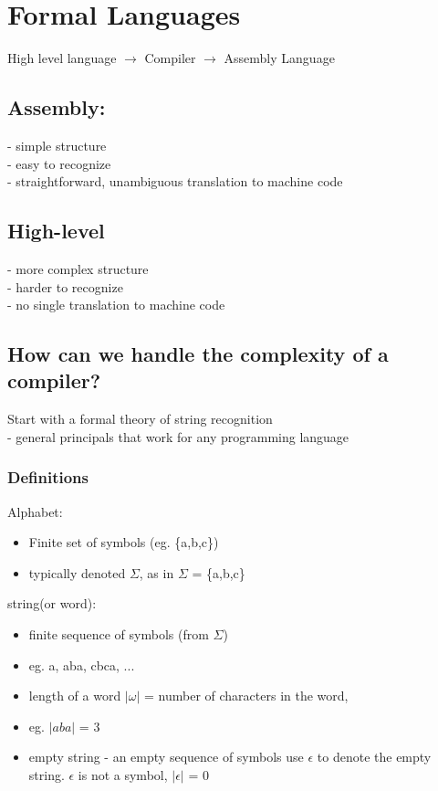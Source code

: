 \documentclass[12pt]{article}
\begin{document}
	\section*{Formal Languages}
	
	High level language $\rightarrow$ Compiler $\rightarrow$ Assembly Language\\
	\subsection*{Assembly:}
	- simple structure\\
	- easy to recognize\\
	- straightforward, unambiguous translation to machine code\\
	
	\subsection*{High-level}
	- more complex structure \\
	- harder to recognize\\
	- no single translation to machine code\\
	
	\subsection*{How can we handle the complexity of a compiler?}
	
	Start with a formal theory of string recognition\\
	- general principals that work for any programming language\\
	
	\subsubsection*{Definitions}
	Alphabet: 
	\begin{itemize}
		\item Finite set of symbols (eg. \{a,b,c\})
		\item typically denoted $\Sigma$, as in $\Sigma$ = \{a,b,c\}
	\end{itemize}
	
	string(or word):
	\begin{itemize}
		\item finite sequence of symbols (from $\Sigma$)
		\item eg. a, aba, cbca, ...
		\item length of a word $|\omega|$ = number of characters in the word,
		\item eg. $|aba|$ = 3
		\item empty string - an empty sequence of symbols use $\epsilon$ to denote the empty string. $\epsilon$ is not a symbol, $|\epsilon|$ = 0
	\end{itemize}
	
\end{document}
